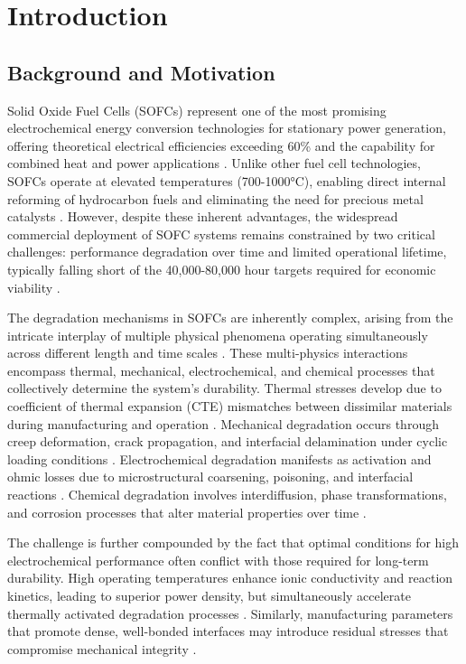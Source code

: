 \documentclass[conference]{IEEEtran}
\begin{document}
\section{Introduction}

\subsection{Background and Motivation}

Solid Oxide Fuel Cells (SOFCs) represent one of the most promising electrochemical energy conversion technologies for stationary power generation, offering theoretical electrical efficiencies exceeding 60\% and the capability for combined heat and power applications \cite{Stambouli2002, Singhal2000}. Unlike other fuel cell technologies, SOFCs operate at elevated temperatures (700-1000°C), enabling direct internal reforming of hydrocarbon fuels and eliminating the need for precious metal catalysts \cite{Minh2004}. However, despite these inherent advantages, the widespread commercial deployment of SOFC systems remains constrained by two critical challenges: performance degradation over time and limited operational lifetime, typically falling short of the 40,000-80,000 hour targets required for economic viability \cite{Javed2023, Zhang2022}.

The degradation mechanisms in SOFCs are inherently complex, arising from the intricate interplay of multiple physical phenomena operating simultaneously across different length and time scales \cite{Mahato2015}. These multi-physics interactions encompass thermal, mechanical, electrochemical, and chemical processes that collectively determine the system's durability. Thermal stresses develop due to coefficient of thermal expansion (CTE) mismatches between dissimilar materials during manufacturing and operation \cite{Selimovic2005}. Mechanical degradation occurs through creep deformation, crack propagation, and interfacial delamination under cyclic loading conditions \cite{Nakajo2012}. Electrochemical degradation manifests as activation and ohmic losses due to microstructural coarsening, poisoning, and interfacial reactions \cite{Hubert2018}. Chemical degradation involves interdiffusion, phase transformations, and corrosion processes that alter material properties over time \cite{Yokokawa2008}.

The challenge is further compounded by the fact that optimal conditions for high electrochemical performance often conflict with those required for long-term durability. High operating temperatures enhance ionic conductivity and reaction kinetics, leading to superior power density, but simultaneously accelerate thermally activated degradation processes \cite{Tucker2007}. Similarly, manufacturing parameters that promote dense, well-bonded interfaces may introduce residual stresses that compromise mechanical integrity \cite{Atkinson2004}.
\end{document}
